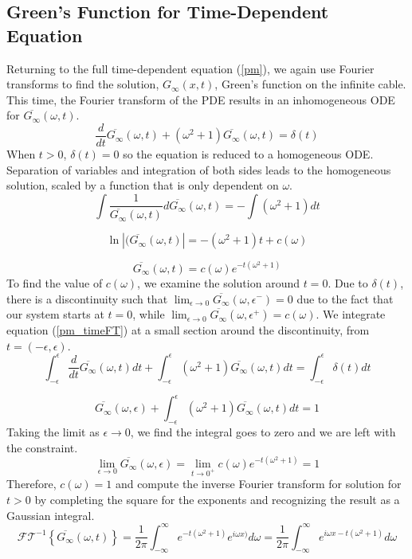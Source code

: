\documentclass[12pt]{article}
\begin{document}
\subsection{Green's Function for Time-Dependent Equation}
Returning to the full time-dependent equation (\ref{pm}), we again use Fourier transforms to find the solution, $G_{\infty}(x,t)$, Green's function on the infinite cable. This time, the Fourier transform of the PDE results in an inhomogeneous ODE for $\overline{G_{\infty}}(\omega,t)$.
\begin{equation}\label{pm_timeFT}
\frac{d}{dt}\overline{G_{\infty}}(\omega,t) + (\omega^2+1)\overline{G_{\infty}}(\omega,t) = \delta(t) 
\end{equation} 
When $t>0$, $\delta(t) = 0$ so the equation is reduced to a homogeneous ODE. Separation of variables and integration of both sides leads to the homogeneous solution, scaled by a function that is only dependent on $\omega$.
$$ \int\frac{1}{\overline{G_{\infty}}(\omega,t)}d\overline{G_{\infty}}(\omega,t) = -\int(\omega^2 + 1)dt $$

$$ \ln|(\overline{G_{\infty}}(\omega,t)| = -(\omega^2+1)t + c(\omega) $$
 
$$\overline{G_{\infty}}(\omega,t) = c(\omega)e^{-t(\omega^2+1)} $$
To find the value of $c(\omega)$, we examine the solution around $t=0$. Due to $\delta(t)$, there is a discontinuity such that $\lim_{\epsilon \to 0}\overline{G_{\infty}}(\omega,\epsilon^-) = 0$ due to the fact that our system starts at $t=0$, while $\lim_{\epsilon \to 0}\overline{G_{\infty}}(\omega,\epsilon^+) = c(\omega)$. We integrate equation (\ref{pm_timeFT}) at a small section around the discontinuity, from $t=(-\epsilon, \epsilon)$. 
$$\int_{-\epsilon}^{\epsilon}\frac{d}{dt}\overline{G_{\infty}}(\omega,t)dt + \int_{-\epsilon}^{\epsilon}(\omega^2+1)\overline{G_{\infty}}(\omega,t)dt = \int_{-\epsilon}^{\epsilon}\delta(t)dt $$

$$  \overline{G_{\infty}}(\omega,\epsilon) + \int_{-\epsilon}^{\epsilon}(\omega^2+1)\overline{G_{\infty}}(\omega,t)dt = 1$$
Taking the limit as $\epsilon \to 0$, we find the integral goes to zero and we are left with the constraint.
$$ \lim_{\epsilon\to 0} \overline{G_{\infty}}(\omega,\epsilon)  = \lim_{t\to 0^+}c(\omega)e^{-t(\omega^2+1)}  = 1 $$
Therefore, $c(\omega) = 1$ and compute the inverse Fourier transform for solution for $t>0$ by completing the square for the exponents and recognizing the result as a Gaussian integral.
$$\mathcal{FT}^{-1}\left\{\overline{G_{\infty}}(\omega,t)\right\} = \frac{1}{2\pi}\int_{-\infty}^{\infty}e^{-t(\omega^2+1)}e^{i \omega x)} d\omega = \frac{1}{2\pi}\int_{-\infty}^{\infty}e^{i \omega x-t(\omega^2+1)}d\omega $$
\end{document}
